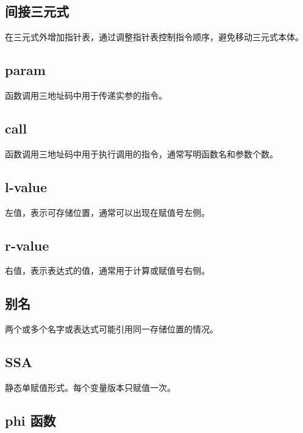 \documentclass[UTF8,zihao=-4]{ctexart}
\begin{document}
\subsection*{间接三元式}

在三元式外增加指针表，通过调整指针表控制指令顺序，避免移动三元式本体。

\subsection*{param}

函数调用三地址码中用于传递实参的指令。

\subsection*{call}

函数调用三地址码中用于执行调用的指令，通常写明函数名和参数个数。

\subsection*{l-value}

左值，表示可存储位置，通常可以出现在赋值号左侧。

\subsection*{r-value}

右值，表示表达式的值，通常用于计算或赋值号右侧。

\subsection*{别名}

两个或多个名字或表达式可能引用同一存储位置的情况。

\subsection*{SSA}

静态单赋值形式。每个变量版本只赋值一次。

\subsection*{phi 函数}
\end{document}
